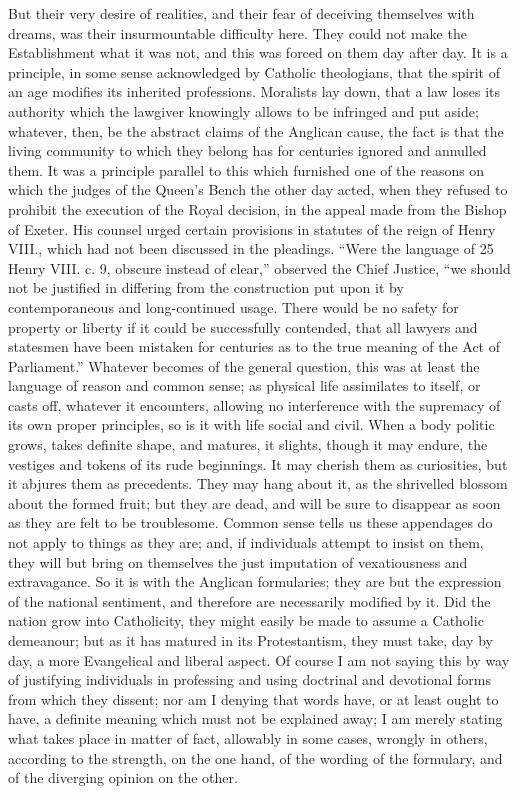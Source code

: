 But their very desire of realities, and their fear of deceiving
themselves with dreams, was their insurmountable difficulty here. They
could not make the Establishment what it was not, and this was forced
on them day after day. It is a principle, in some sense acknowledged
by Catholic theologians, that the spirit of an age modifies its
inherited professions. Moralists lay down, that a law loses its
authority which the lawgiver knowingly allows to be infringed and put
aside; whatever, then, be the abstract claims of the Anglican cause,
the fact is that the living community to which they belong has for
centuries ignored and annulled them. It was a principle parallel to
this which furnished one of the reasons on which the judges of the
Queen's Bench the other day acted, when they refused to prohibit the
execution of the Royal decision, in the appeal made from the Bishop of
Exeter. His counsel urged certain provisions in statutes of the reign
of Henry VIII., which had not been discussed in the pleadings.
``Were the language of 25 Henry VIII. c. 9, obscure instead of
clear,'' observed the Chief Justice, ``we should not be justified in
differing from the construction put upon it by contemporaneous and
long-continued usage. There would be no safety for property or liberty
if it could be successfully contended, that all lawyers and statesmen
have been mistaken for centuries as to the true meaning of the Act of
Parliament.'' Whatever becomes of the general question, this was
at least the language of reason and common sense; as physical life
assimilates to itself, or casts off, whatever it encounters, allowing
no interference with the supremacy of its own proper principles, so is
it with life social and civil. When a body politic grows, takes
definite shape, and matures, it slights, though it may endure, the
vestiges and tokens of its rude beginnings. It may cherish them as
curiosities, but it abjures them as precedents. They may hang about
it, as the shrivelled blossom about the formed fruit; but they are
dead, and will be sure to disappear as soon as they are felt to be
troublesome. Common sense tells us these appendages do not apply to
things as they are; and, if individuals attempt to insist on them,
they will but bring on themselves the just imputation of vexatiousness
and extravagance. So it is with the Anglican formularies; they are but
the expression of the national sentiment, and therefore are
necessarily modified by it. Did the nation grow into Catholicity, they
might easily be made to assume a Catholic demeanour; but as it has
matured in its Protestantism, they must take, day by day, a more
Evangelical and liberal aspect. Of course I am not saying this by way
of justifying individuals in professing and using doctrinal and
devotional forms from which they dissent; nor am I denying that words
have, or at least ought to have, a definite meaning which must not be
explained away; I am merely stating what takes place in matter of
fact, allowably in some cases, wrongly in others, according to the
strength, on the one hand, of the wording of the formulary, and of the
diverging opinion on the other.

